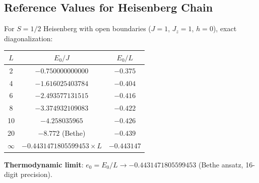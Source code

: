 \documentclass[aps,prb,onecolumn,scriptaddress]{revtex4-2}
\begin{document}
		\subsection{Reference Values for Heisenberg Chain}
		
		For $S=1/2$ Heisenberg with open boundaries ($J=1$, $J_z=1$, $h=0$), exact diagonalization:
		
		\begin{center}
		\begin{tabular}{@{}ccc@{}}
			\toprule
			$L$ & $E_0 / J$ & $E_0 / L$ \\
			\midrule
			2 & $-0.750000000000$ & $-0.375$ \\
			4 & $-1.616025403784$ & $-0.404$ \\
			6 & $-2.493577131515$ & $-0.416$ \\
			8 & $-3.374932109083$ & $-0.422$ \\
			10 & $-4.258035965$ & $-0.426$ \\
			20 & $-8.772$ (Bethe) & $-0.439$ \\
			$\infty$ & $-0.4431471805599453 \times L$ & $-0.443147$ \\
			\bottomrule
		\end{tabular}
		\end{center}
		
		\textbf{Thermodynamic limit}: $e_0 = E_0/L \to -0.4431471805599453$ (Bethe ansatz, 16-digit precision).
		
\end{document}
